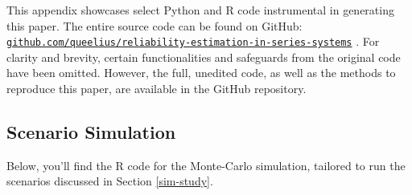 \documentclass[
]{article}
\theoremstyle{definition}
\theoremstyle{plain}
\theoremstyle{definition}
\theoremstyle{definition}
\theoremstyle{definition}
\theoremstyle{definition}
\theoremstyle{remark}
\begin{document}
This appendix showcases select Python and R code instrumental in generating
this paper. The entire source code can be found on GitHub:
\href{https://github.com/queelius/reliability-estimation-in-series-systems}{\texttt{github.com/queelius/reliability-estimation-in-series-systems}}
\citep{towell2023reliability}. For clarity and brevity, certain functionalities and
safeguards from the original code have been omitted. However, the full, unedited
code, as well as the methods to reproduce this paper, are available in the
GitHub repository.

\hypertarget{app-sim-study-r}{%
\subsection{Scenario Simulation}\label{app-sim-study-r}}

Below, you'll find the R code for the Monte-Carlo simulation, tailored to run
the scenarios discussed in Section \ref{sim-study}.
\end{document}
